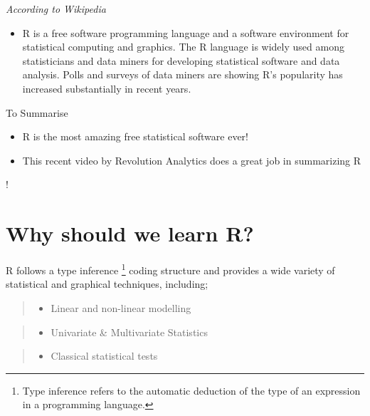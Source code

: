 \documentclass[]{book}
\providecommand{\tightlist}{%
  \setlength{\itemsep}{0pt}\setlength{\parskip}{0pt}}
\let\rmarkdownfootnote\footnote%
\def\footnote{\protect\rmarkdownfootnote}
\begin{document}
\emph{According to Wikipedia}

\begin{itemize}
\tightlist
\item
  R is a free software programming language and a software environment
  for statistical computing and graphics. The R language is widely used
  among statisticians and data miners for developing statistical
  software and data analysis. Polls and surveys of data miners are
  showing R's popularity has increased substantially in recent years.
\end{itemize}

To Summarise

\begin{itemize}
\item
  R is the most amazing free statistical software ever!
\item
  This recent video by Revolution Analytics does a great job in
  summarizing R
\end{itemize}

!

\section{Why should we learn R?}\label{why-should-we-learn-r}

R follows a type inference \footnote{Type inference refers to the
  automatic deduction of the type of an expression in a programming
  language.} coding structure and provides a wide variety of statistical
and graphical techniques, including;

\begin{quote}
\begin{itemize}
\tightlist
\item
  Linear and non-linear modelling
\end{itemize}
\end{quote}

\begin{quote}
\begin{itemize}
\tightlist
\item
  Univariate \& Multivariate Statistics
\end{itemize}
\end{quote}

\begin{quote}
\begin{itemize}
\tightlist
\item
  Classical statistical tests
\end{itemize}
\end{quote}
\end{document}
